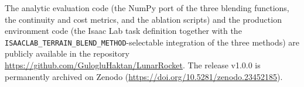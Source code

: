 The analytic evaluation code (the NumPy port of the three blending functions, the continuity and cost metrics, and the ablation scripts) and the production environment code (the Isaac Lab task definition together with the \texttt{ISAACLAB\_TERRAIN\_BLEND\_METHOD}-selectable integration of the three methods) are publicly available in the repository \url{https://github.com/GulogluHaktan/LunarRocket}. The release v1.0.0 is permanently archived on Zenodo (\url{https://doi.org/10.5281/zenodo.23452185}).
